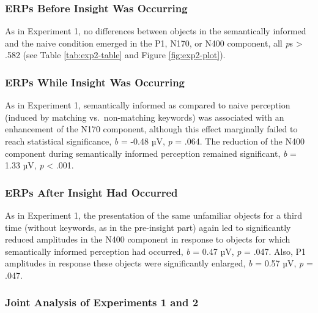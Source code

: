 \documentclass[
  english,
  man,floatsintext]{apa7}
\begin{document}
\hypertarget{erps-before-insight-was-occurring-1}{%
\subsubsection{ERPs Before Insight Was Occurring}\label{erps-before-insight-was-occurring-1}}

As in Experiment 1, no differences between objects in the semantically informed and the naive condition emerged in the P1, N170, or N400 component, all \emph{p}s \textgreater{} .582 (see Table \ref{tab:exp2-table} and Figure \ref{fig:exp2-plot}).

\hypertarget{erps-while-insight-was-occurring-1}{%
\subsubsection{ERPs While Insight Was Occurring}\label{erps-while-insight-was-occurring-1}}

As in Experiment 1, semantically informed as compared to naive perception (induced by matching vs.~non-matching keywords) was associated with an enhancement of the N170 component, although this effect marginally failed to reach statistical significance, \emph{b} = -0.48 µV, \emph{p} = .064. The reduction of the N400 component during semantically informed perception remained significant, \emph{b} = 1.33 µV, \emph{p} \textless{} .001.

\hypertarget{erps-after-insight-had-occurred-1}{%
\subsubsection{ERPs After Insight Had Occurred}\label{erps-after-insight-had-occurred-1}}

As in Experiment 1, the presentation of the same unfamiliar objects for a third time (without keywords, as in the pre-insight part) again led to significantly reduced amplitudes in the N400 component in response to objects for which semantically informed perception had occurred, \emph{b} = 0.47 µV, \emph{p} = .047. Also, P1 amplitudes in response these objects were significantly enlarged, \emph{b} = 0.57 µV, \emph{p} = .047.

\hypertarget{joint-analysis-of-experiments-1-and-2}{%
\subsubsection{Joint Analysis of Experiments 1 and 2}\label{joint-analysis-of-experiments-1-and-2}}
\end{document}
